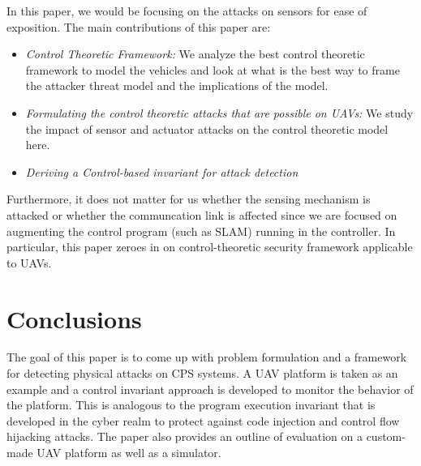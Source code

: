 In this paper, we would be focusing on the attacks on sensors for ease of exposition. The main contributions of this paper are:

\begin{itemize}
    \item \textit{Control Theoretic Framework:} We analyze the best control theoretic framework to model the vehicles and look at what is the best way to frame the attacker threat model and the implications of the model.
    \item \textit{Formulating the control theoretic attacks that are possible on UAVs:} We study the impact of sensor and actuator attacks on the control theoretic model here.
    \item \textit{Deriving a Control-based invariant for attack detection}
\end{itemize}

Furthermore, it does not matter for us whether the sensing mechanism is attacked or whether the communcation link is affected since we are focused on augmenting the control program (such as SLAM) running in the controller. In particular, this paper zeroes in on control-theoretic security framework applicable to UAVs.








\section{Conclusions}
The goal of this paper is to come up with problem formulation and a framework for detecting physical attacks on CPS systems. A UAV platform is taken as an example and a control invariant approach is developed to monitor the behavior of the platform. This is analogous to the program execution invariant that is developed in the cyber realm to protect against code injection and control flow hijacking attacks. The paper also provides an outline of evaluation on a custom-made UAV platform as well as a simulator.

\appendix



%

